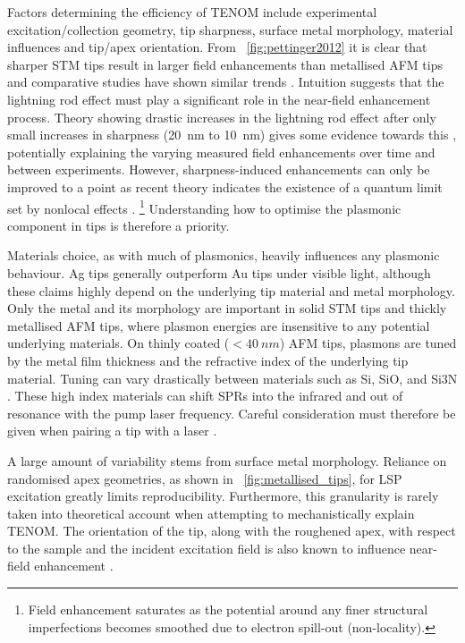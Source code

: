 \documentclass{article}
\begin{document}
Factors determining the efficiency of TENOM include experimental excitation/collection geometry, tip sharpness, surface metal morphology, material influences and tip/apex orientation. From \figurename~\ref{fig:pettinger2012} it is clear that sharper STM tips result in larger field enhancements than metallised AFM tips and comparative studies have shown similar trends \cite{raschke2003, yeo2006, picardi2007}. Intuition suggests that the lightning rod effect must play a significant role in the near-field enhancement process. Theory showing drastic increases in the lightning rod effect after only small increases in sharpness (\SI{20}{nm} to \SI{10}{nm}) gives some evidence towards this \cite{zhang2009, meng2015}, potentially explaining the varying measured field enhancements over time and between experiments. However, sharpness-induced enhancements can only be improved to a point as recent theory indicates the existence of a quantum limit set by nonlocal effects \cite{wiener2012}.%
\footnote{Field enhancement saturates as the potential around any finer structural imperfections becomes smoothed due to electron spill-out (non-locality).}
Understanding how to optimise the plasmonic component in tips is therefore a priority.

Materials choice, as with much of plasmonics, heavily influences any plasmonic behaviour. Ag tips generally outperform Au tips under visible light, although these claims highly depend on the underlying tip material and metal morphology. Only the metal and its morphology are important in solid STM tips and thickly metallised AFM tips, where plasmon energies are insensitive to any potential underlying materials. On thinly coated ($<\SI{40}{nm}$) AFM tips, plasmons are tuned by the metal film thickness \cite{huber2014} and the refractive index of the underlying tip material. Tuning can vary drastically between materials such as Si, SiO, and Si\subs3N \cite{picardi2007, taguchi2009}. These high index materials can shift SPRs into the infrared and out of resonance with the pump laser frequency. Careful consideration must therefore be given when pairing a tip with a laser \cite{yeo2006, yeo2007, cui2007, hayazawa2012}.

A large amount of variability stems from surface metal morphology. Reliance on randomised apex geometries, as shown in \figurename~\ref{fig:metallised_tips}, for LSP excitation greatly limits reproducibility. Furthermore, this granularity is rarely taken into theoretical account when attempting to mechanistically explain TENOM. The orientation of the tip, along with the roughened apex, with respect to the sample and the incident excitation field is also known to influence near-field enhancement \cite{yeo2006, mino2014}.
\end{document}
